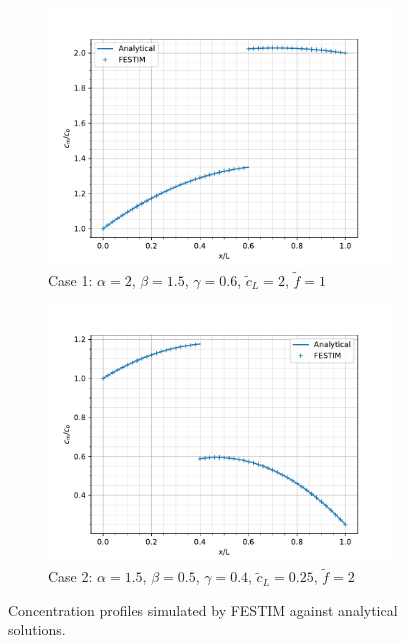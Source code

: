 \begin{figure} [b]
    \centering
    \begin{subfigure}{\linewidth}
        \centering
        \includegraphics[width=\linewidth]{Figures/Chapter3/monoblocks/interface_condition/out_MES_case1.pdf}
        \caption{Case 1: $\alpha = 2$, $\beta = 1.5$, $\gamma=0.6$, $\tilde{c}_L = 2$, $\tilde{f}=1$}
    \end{subfigure}
    \begin{subfigure}{\linewidth}
        \centering
        \includegraphics[width=\linewidth]{Figures/Chapter3/monoblocks/interface_condition/out_MES_case2.pdf}
        \caption{Case 2:  $\alpha = 1.5$, $\beta = 0.5$, $\gamma=0.4$, $\tilde{c}_L = 0.25$, $\tilde{f}=2$}
    \end{subfigure}
    \caption{Concentration profiles simulated by FESTIM against analytical solutions.}
    \label{fig:comparison MES}
\end{figure}

